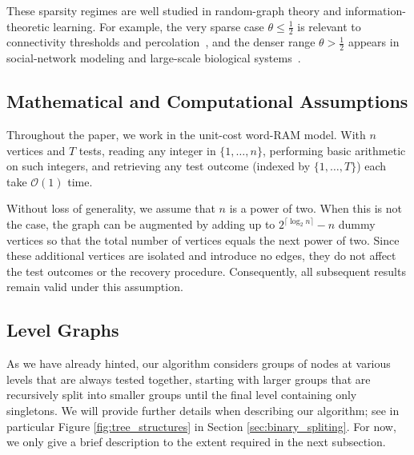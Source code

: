 \documentclass[journal]{IEEEtran}
\theoremstyle{definition}
\theoremstyle{definition}
\newcommand{\bigO}{\mathcal{O}}
\begin{document}
These sparsity regimes are well studied in random-graph theory and information-theoretic learning. 
For example, the very sparse case \( \theta \leq \tfrac{1}{2} \) is relevant to connectivity thresholds and percolation~\cite{bollobas2011random}, and the denser range \( \theta>\tfrac{1}{2} \) appears in social-network modeling and large-scale biological systems~\cite{newman2003structure}.
\subsection{Mathematical and Computational Assumptions}
\label{sec:assumption}
Throughout the paper, we work in the unit-cost word-RAM model. With \(n\) vertices and \(T\) tests, reading any integer in \(\{1,\dots,n\}\), performing basic arithmetic on such integers, and retrieving any test outcome (indexed by \(\{1,\dots,T\}\)) each take \(\bigO(1)\) time.

Without loss of generality, we assume that \( n \) is a power of two. When this is not the case, the graph can be augmented by adding up to \( 2^{\lceil \log_2 n \rceil} - n \) dummy vertices so that the total number of vertices equals the next power of two. Since these additional vertices are isolated and introduce no edges, they do not affect the test outcomes or the recovery procedure. Consequently, all subsequent results remain valid under this assumption.

\subsection{Level Graphs}
\label{sec:level_graph}

As we have already hinted, our algorithm considers groups of nodes at various levels that are always tested together, starting with larger groups that are recursively split into smaller groups until the final level containing only singletons.  We will provide further details when describing our algorithm; see in particular Figure \ref{fig:tree_structures} in Section \ref{sec:binary_spliting}.  For now, we only give a brief description to the extent required in the next subsection.

\end{document}
